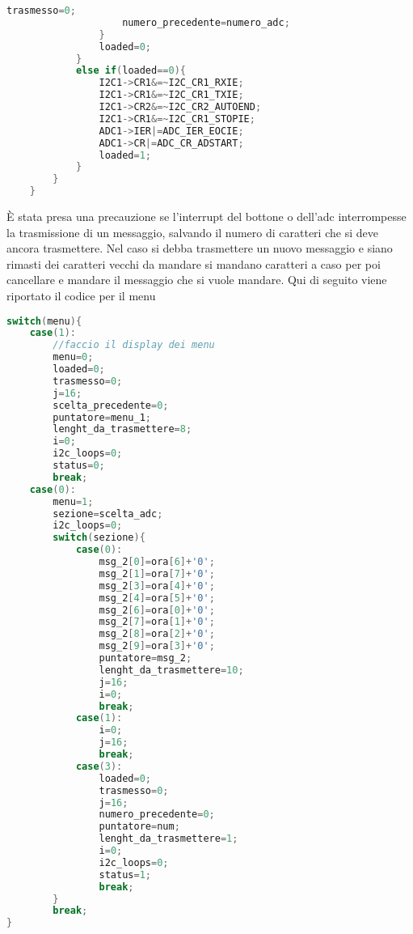 \documentclass[main.tex]{subfiles}
\begin{document}
\begin{lstlisting}[caption=Porzione codice impostazioni, language=C]
					trasmesso=0;
					numero_precedente=numero_adc;
				}
				loaded=0;
			}
			else if(loaded==0){
				I2C1->CR1&=~I2C_CR1_RXIE;
				I2C1->CR1&=~I2C_CR1_TXIE;
				I2C1->CR2&=~I2C_CR2_AUTOEND;
				I2C1->CR1&=~I2C_CR1_STOPIE;
				ADC1->IER|=ADC_IER_EOCIE;
				ADC1->CR|=ADC_CR_ADSTART;
				loaded=1;
			}
		}
	}
\end{lstlisting}
È stata presa una precauzione se l'interrupt del bottone o dell'adc interrompesse la trasmissione di un messaggio, salvando il numero di caratteri che si deve ancora trasmettere. Nel caso si debba trasmettere un nuovo messaggio e siano rimasti dei caratteri vecchi da mandare si mandano caratteri a caso per poi cancellare e mandare il messaggio che si vuole mandare. 
Qui di seguito viene riportato il codice per il menu
\begin{lstlisting}[caption=Menu, language=C]
switch(menu){
	case(1):
		//faccio il display dei menu
		menu=0;
		loaded=0;
		trasmesso=0;
		j=16;
		scelta_precedente=0;
		puntatore=menu_1;
		lenght_da_trasmettere=8;
		i=0;
		i2c_loops=0;
		status=0;
		break;
	case(0):
		menu=1;
		sezione=scelta_adc;
		i2c_loops=0;
		switch(sezione){
			case(0):
				msg_2[0]=ora[6]+'0';
				msg_2[1]=ora[7]+'0';
				msg_2[3]=ora[4]+'0';
				msg_2[4]=ora[5]+'0';
				msg_2[6]=ora[0]+'0';
				msg_2[7]=ora[1]+'0';
				msg_2[8]=ora[2]+'0';
				msg_2[9]=ora[3]+'0';
				puntatore=msg_2;
				lenght_da_trasmettere=10;
				j=16;
				i=0;
				break;
			case(1):
				i=0;
				j=16;
                break;
			case(3):
				loaded=0;
				trasmesso=0;
				j=16;
				numero_precedente=0;
				puntatore=num;
				lenght_da_trasmettere=1;
				i=0;
				i2c_loops=0;
				status=1;
                break;
		}
		break;
}
\end{lstlisting}
\end{document}
